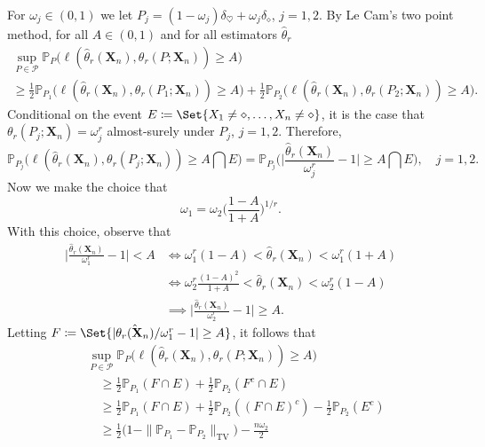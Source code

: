 \documentclass{article}
\newcommand{\1}{\boldsymbol{1}}
\newcommand{\PP}{\mathbb{P}}
\theoremstyle{plain}
\begin{document}
For $\omega_j \in (0,1)$ we let $P_j = (1-\omega_j)\delta_{\heartsuit} + \omega_j\delta_{\diamond}$, $j=1,2$. By Le Cam's two point method, for all $A \in (0,1)$ and for all estimators $\hat{\theta}_r$%
\begin{multline*}
  \sup_{P\in \mathcal{P}}\PP_P\Big(%
  \ell(\hat{\theta}_r(\mathbf{X}_n),\theta_r(P;\mathbf{X}_n)) \geq A
  \Big)\\%
  \geq
    \frac{1}{2}\PP_{P_1}\Big(%
  \ell(\hat{\theta}_r(\mathbf{X}_n),\theta_r(P_1;\mathbf{X}_n)) \geq A
    \Big)%
    + \frac{1}{2}\PP_{P_2}\Big(%
  \ell(\hat{\theta}_r(\mathbf{X}_n),\theta_r(P_2;\mathbf{X}_n)) \geq A
  \Big).
\end{multline*}
Conditional on the event $E \coloneqq \Set{X_1 \ne \diamond,\dots,X_n\ne \diamond}$, it is the case that $\theta_r(P_j;\mathbf{X}_n) = \omega_j^r$ almost-surely under $P_j$, $j=1,2$. Therefore,
\begin{equation*}
  \PP_{P_j}\Big(%
  \ell(\hat{\theta}_r(\mathbf{X}_n),\theta_r(P_j;\mathbf{X}_n)) \geq A%
  \bigcap E
  \Big)%
  = \PP_{P_j}\Big(%
  \Big|\frac{\hat{\theta}_r(\mathbf{X}_n)}{\omega_j^r} - 1 \Big| \geq A
   \bigcap E\Big),\quad j=1,2.
\end{equation*}
Now we make the choice that
\begin{equation*}
  \omega_1 = \omega_2\Big(\frac{1-A}{1 + A} \Big)^{1/r}.
\end{equation*}
With this choice, observe that
\begin{align*}
  \Big|\frac{\hat{\theta}_r(\mathbf{X}_n)}{\omega_1^r} - 1 \Big|%
  < A%
  &\iff \omega_1^r(1- A) < \hat{\theta}_r(\mathbf{X}_n) < \omega_1^r(1+A)\\
  &\iff \omega_2^r\frac{(1-A)^2}{1+A}< \hat{\theta}_r(\mathbf{X}_n) < \omega_2^r(1-A)\\
  &\implies \Big|\frac{\hat{\theta}_r(\mathbf{X}_n)}{\omega_2^r} - 1\Big|%
    \geq A.
\end{align*}
Letting $F \coloneqq \Set{ |\hat{\theta_r(\mathbf{X}_n)}/\omega_1^r - 1| \geq A }$, it follows that
\begin{align*}
   &\sup_{P\in \mathcal{P}}\PP_P\Big(%
  \ell(\hat{\theta}_r(\mathbf{X}_n),\theta_r(P;\mathbf{X}_n)) \geq A
  \Big)\\
  &\quad\geq \frac{1}{2}\PP_{P_1}(F \cap E)%
    + \frac{1}{2}\PP_{P_2}(F^c \cap E)\\
  &\quad\geq \frac{1}{2}\PP_{P_1}(F \cap E)%
    + \frac{1}{2}\PP_{P_2}( (F \cap E)^c )%
    - \frac{1}{2}\PP_{P_2}(E^c)\\
  &\quad\geq%
    \frac{1}{2}\Big(1 - \|\PP_{P_1} - \PP_{P_2}\|_{\textrm{TV}}\Big)%
    - \frac{n\omega_2}{2}
\end{align*}
\end{document}
